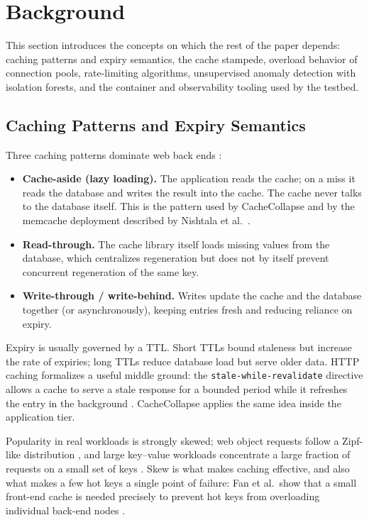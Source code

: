 \section{Background}
\label{sec:background}

This section introduces the concepts on which the rest of the paper depends: caching
patterns and expiry semantics, the cache stampede, overload behavior of connection
pools, rate-limiting algorithms, unsupervised anomaly detection with isolation
forests, and the container and observability tooling used by the testbed.

\subsection{Caching Patterns and Expiry Semantics}
\label{sec:bg-caching}
Three caching patterns dominate web back ends \cite{kleppmann2017}:
\begin{itemize}[leftmargin=*]
\item \textbf{Cache-aside (lazy loading).} The application reads the cache; on a miss
it reads the database and writes the result into the cache. The cache never talks to
the database itself. This is the pattern used by CacheCollapse and by the memcache
deployment described by Nishtala et al.\ \cite{nishtala2013}.
\item \textbf{Read-through.} The cache library itself loads missing values from the
database, which centralizes regeneration but does not by itself prevent concurrent
regeneration of the same key.
\item \textbf{Write-through / write-behind.} Writes update the cache and the database
together (or asynchronously), keeping entries fresh and reducing reliance on expiry.
\end{itemize}
Expiry is usually governed by a TTL. Short TTLs bound staleness but increase the
rate of expiries; long TTLs reduce database load but serve older data. HTTP caching
formalizes a useful middle ground: the \texttt{stale-while-revalidate} directive
allows a cache to serve a stale response for a bounded period while it refreshes the
entry in the background \cite{rfc5861}. CacheCollapse applies the same idea inside
the application tier.

Popularity in real workloads is strongly skewed; web object requests follow a
Zipf-like distribution \cite{breslau1999}, and large key--value workloads concentrate
a large fraction of requests on a small set of keys \cite{atikoglu2012}. Skew is what
makes caching effective, and also what makes a few hot keys a single point of
failure: Fan et al.\ show that a small front-end cache is needed precisely to prevent
hot keys from overloading individual back-end nodes \cite{fan2011}.


